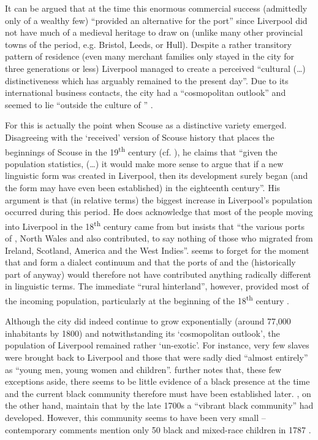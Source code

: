 It can be argued that at the time this enormous commercial success (admittedly only of a wealthy few) ``provided an alternative  for the port'' since Liverpool did not have much of a medieval heritage to draw on (unlike many other provincial towns of the period, e.g. Bristol, Leeds, or Hull).
Despite a rather transitory pattern of residence (even many merchant families only stayed in the city for three generations or less) Liverpool managed to create a perceived ``cultural (\ldots) distinctiveness which has arguably remained to the present day''. Due to its international business contacts, the city had a ``cosmopolitan outlook'' and seemed to lie ``outside the culture of '' \citep[152--154]{longmore2006}.

For \citet[28]{crowley2012} this is actually the point when Scouse as a distinctive variety emerged.
Disagreeing with the `received' version of Scouse history that places the beginnings of Scouse in the 19\textsuperscript{th} century (cf. ), he claims that ``given the population statistics, (\dots) it would make more sense to argue that if a new linguistic form was created in Liverpool, then its development surely began (and the form may have even been established) in the eighteenth century''.
His argument is that (in relative terms) the biggest increase in Liverpool's population occurred during this period.
He does acknowledge that most of the people moving into Liverpool in the 18\textsuperscript{th} century came from  but insists that ``the various ports of , North Wales and  also contributed, to say nothing of those who migrated from Ireland, Scotland, America and the West Indies''.
\citeauthor{crowley2012} seems to forget for the moment that  and  form a dialect continuum and that the ports of  and the  (historically part of  anyway) would therefore not have contributed anything radically different in linguistic terms.
The immediate ``rural hinterland'', however, provided most of the incoming population, particularly at the beginning of the 18\textsuperscript{th} century \parencite[cf.][119]{longmore2006}.

Although the city did indeed continue to grow exponentially (around 77,000 inhabitants by 1800) and notwithstanding its `cosmopolitan outlook', the population of Liverpool remained rather `un-exotic'.
For instance, very few slaves were brought back to Liverpool and those that were sadly died ``almost entirely'' as ``young men, young women and children''.
\textcite[cf.][161 and 169]{longmore2006} further notes that, these few exceptions aside, there seems to be little evidence of a black presence at the time and the current black community therefore must have been established later. \textcite{belchemmacraild2006}, on the other hand, maintain that by the late 1700s a ``vibrant black community'' had developed. However, this community seems to have been very small -- contemporary comments mention only 50 black and mixed-race children in 1787 \parencite[324]{belchemmacraild2006}.

